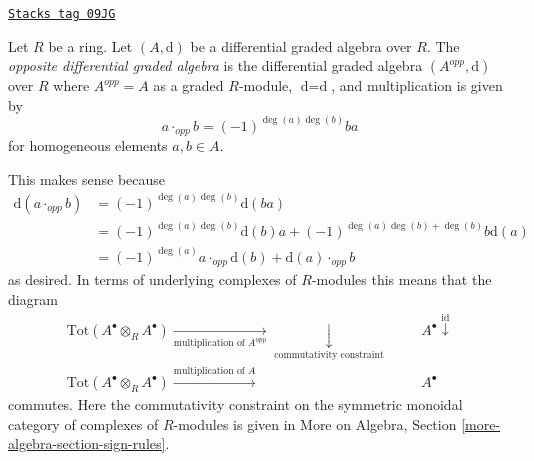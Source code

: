 \begin{definition}
\label{dga-definition-opposite-dga}
\href{https://stacks.math.columbia.edu/tag/09JG}{\texttt{Stacks tag 09JG}}

Let $R$ be a ring. Let $(A, \text{d})$ be a differential graded algebra
over $R$. The {\it opposite differential graded algebra} is the differential
graded algebra $(A^{opp}, \text{d})$ over $R$ where $A^{opp} = A$
as a graded $R$-module, $\text{d} = \text{d}$, and multiplication is
given by
$$
a \cdot_{opp} b = (-1)^{\deg(a)\deg(b)} b a
$$
for homogeneous elements $a, b \in A$.
\end{definition}

This makes sense because
\begin{align*}
\text{d}(a \cdot_{opp} b)
& =
(-1)^{\deg(a)\deg(b)} \text{d}(b a) \\
& =
(-1)^{\deg(a)\deg(b)} \text{d}(b) a +
(-1)^{\deg(a)\deg(b) + \deg(b)}b\text{d}(a) \\
& =
(-1)^{\deg(a)}a \cdot_{opp} \text{d}(b) + \text{d}(a) \cdot_{opp} b
\end{align*}
as desired. In terms of underlying complexes of $R$-modules
this means that the diagram
$$
\begin{array}{cccc}\text{Tot}(A^\bullet \otimes_R A^\bullet)
\underset{\text{multiplication of }A^{opp}}{\longrightarrow}\underset{\text{commutativity constraint}}{\downarrow} &  &  & A^\bullet \overset{\text{id}}{\downarrow} \\ \text{Tot}(A^\bullet \otimes_R A^\bullet)
\overset{\text{multiplication of }A}{\longrightarrow} &  &  & A^\bullet\end{array}
$$
commutes. Here the commutativity constraint on the symmetric monoidal
category of complexes of $R$-modules is given in
More on Algebra, Section \ref{more-algebra-section-sign-rules}.

